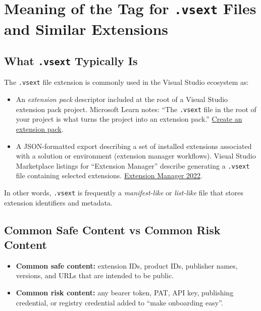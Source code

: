 \documentclass[11pt]{article}
\newcommand{\code}[1]{\texttt{#1}}
\begin{document}
\section{Meaning of the Tag for \code{.vsext} Files and Similar Extensions}
\subsection{What \code{.vsext} Typically Is}
The \code{.vsext} file extension is commonly used in the Visual Studio ecosystem as:
\begin{itemize}
  \item An \emph{extension pack} descriptor included at the root of a Visual Studio extension pack project. Microsoft Learn notes: ``The \code{.vsext} file in the root of your project is what turns the project into an extension pack.'' \href{https://learn.microsoft.com/en-us/visualstudio/extensibility/vsix/publish/create-extension-pack?view=visualstudio}{Create an extension pack}.
  \item A JSON-formatted export describing a set of installed extensions associated with a solution or environment (extension manager workflows). Visual Studio Marketplace listings for ``Extension Manager'' describe generating a \code{.vsext} file containing selected extensions. \href{https://marketplace.visualstudio.com/items?itemName=Loop8ack.ExtensionManager2022}{Extension Manager 2022}.
\end{itemize}

In other words, \code{.vsext} is frequently a \emph{manifest-like} or \emph{list-like} file that stores extension identifiers and metadata.

\subsection{Common Safe Content vs Common Risk Content}
\begin{itemize}
  \item \textbf{Common safe content:} extension IDs, product IDs, publisher names, versions, and URLs that are intended to be public.
  \item \textbf{Common risk content:} any bearer token, PAT, API key, publishing credential, or registry credential added to ``make onboarding easy''.
\end{itemize}
\end{document}

